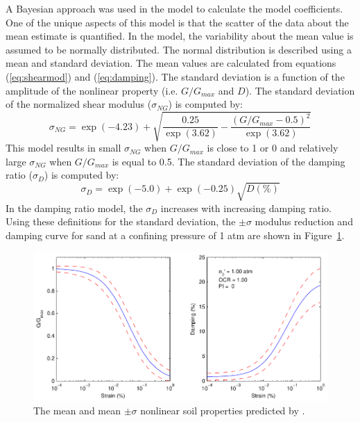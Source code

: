 \documentclass[11pt]{report}
\begin{document}
A Bayesian approach was used in the \citet{darendeli:01} model to calculate the model coefficients.
One of the unique aspects of this model is that the scatter of the data about the mean estimate is
quantified.  In the \citet{darendeli:01} model, the variability about the mean value is assumed to
be normally distributed.  The normal distribution is described using a mean and standard deviation.
The mean values are calculated from equations (\ref{eq:shearmod}) and (\ref{eq:damping}). The
standard deviation is a function of the amplitude of the nonlinear property (i.e. $G/G_{max}$ and
$D$).  The standard deviation of the normalized shear modulus ($\sigma_{NG}$) is computed by:
\begin{equation}
  \sigma_{NG} = \exp(-4.23) + \sqrt{ \frac{0.25}{\exp(3.62)} - \frac{\left(G/G_{max} -
  0.5\right)^2}{\exp(3.62)} }
  \label{eq:sigmaShear}
\end{equation}
This model results in small $\sigma_{NG}$ when $G/G_{max}$ is close to 1 or 0 and relatively large
$\sigma_{NG}$ when $G/G_{max}$ is equal to 0.5. The standard deviation of the damping ratio
($\sigma_{D}$) is computed by:
\begin{equation}
  \sigma_{D} = \exp(-5.0) + \exp(-0.25) \sqrt{D (\%)}
  \label{eq:sigmaDamping}
\end{equation}
In the damping ratio model, the $\sigma_{D}$ increases with increasing damping ratio.  Using these
definitions for the standard deviation, the $\pm\sigma$ modulus reduction and damping curve for sand
at a confining pressure of 1 atm are shown in Figure~\ref{fig:siteResponse:nlEmpiricalSigma}.

\begin{figure}[tb]
  \begin{center}
	\includegraphics[width=\linewidth]{figures/siteResponse/nlEmpiricalSigma.pdf}
  \end{center}
  \caption{The mean and mean $\pm\sigma$ nonlinear soil properties predicted by \citet{darendeli:01}.}
  \label{fig:siteResponse:nlEmpiricalSigma}
\end{figure}
\clearpage 
\end{document}
